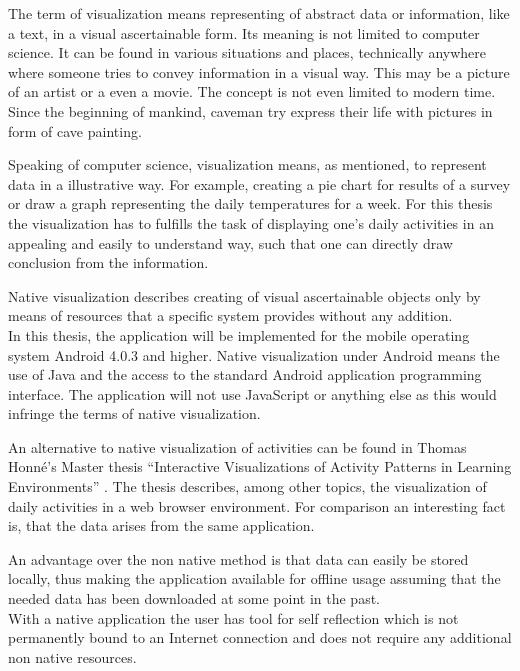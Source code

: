 The  term of visualization means representing of abstract data or information, like a text, in a visual ascertainable form. Its meaning is not limited to computer science. It can be found in various situations and places, technically anywhere where someone tries to convey information in a visual way. This may be a picture of an artist or a even a movie. The concept is not even limited to modern time. Since the beginning of mankind, caveman try express their life with pictures in form of cave painting.

Speaking of computer science, visualization means, as mentioned, to represent data in a illustrative way. For example, creating a pie chart for results of a survey or draw a graph representing the daily temperatures for a week. For this thesis the visualization has to fulfills the task of displaying one's daily activities in an appealing and easily to understand way, such that one can directly draw conclusion from the information.

Native  visualization describes creating of visual ascertainable objects only by means of resources that a specific system provides without any addition.\\
In this thesis, the application will be implemented for the mobile operating system Android 4.0.3 and higher. Native visualization under Android means the use of Java and the access to the standard Android application programming interface. The application will not use JavaScript or anything else as this would infringe the terms of native visualization.

An  alternative to native visualization of activities can be found in Thomas Honné's Master thesis ``Interactive Visualizations of Activity Patterns in Learning Environments'' \cite{thomasthesis}. The thesis describes, among other topics, the visualization of daily activities in a web browser environment. For comparison an interesting fact is, that the data arises from the same application.

An advantage over the non native method is that data can easily be stored locally, thus making the application available for offline usage assuming that the needed data has been downloaded at some point in the past.\\
With a native application the user has tool for self reflection which is not permanently bound to an Internet connection and does not require any additional non native resources.

